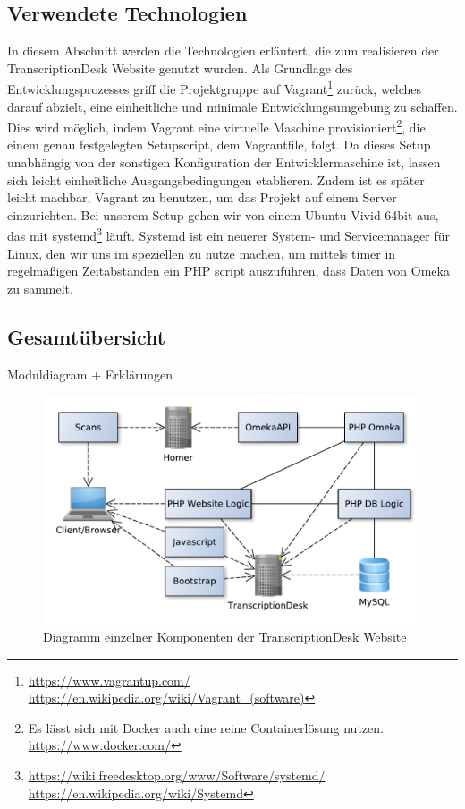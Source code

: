 \documentclass{article}
\begin{document}
\subsection{Verwendete Technologien}
In diesem Abschnitt werden die Technologien erläutert,
die zum realisieren der TranscriptionDesk Website genutzt wurden.
Als Grundlage des Entwicklungsprozesses griff die Projektgruppe auf Vagrant\footnote{
    \url{https://www.vagrantup.com/}\\
    \url{https://en.wikipedia.org/wiki/Vagrant_(software)}}
zurück, welches darauf abzielt, eine einheitliche und minimale Entwicklungsumgebung zu schaffen.
Dies wird möglich, indem Vagrant eine virtuelle Maschine provisioniert\footnote{
    Es lässt sich mit Docker auch eine reine Containerlösung nutzen.\\
    \url{https://www.docker.com/}},
die einem genau festgelegten Setupscript, dem Vagrantfile, folgt.
Da dieses Setup unabhängig von der sonstigen Konfiguration der Entwicklermaschine ist,
lassen sich leicht einheitliche Ausgangsbedingungen etablieren.
Zudem ist es später leicht machbar, Vagrant zu benutzen,
um das Projekt auf einem Server einzurichten.
Bei unserem Setup gehen wir von einem Ubuntu Vivid 64bit aus,
das mit systemd\footnote{
    \url{https://wiki.freedesktop.org/www/Software/systemd/}\\
    \url{https://en.wikipedia.org/wiki/Systemd}}
läuft. Systemd ist ein neuerer System- und Servicemanager für Linux,
den wir uns im speziellen zu nutze machen,
um mittels timer in regelmäßigen Zeitabständen
ein PHP script auszuführen,
dass Daten von Omeka zu sammelt.%

\subsection{Gesamtübersicht}
Moduldiagram + Erklärungen
\\\begin{figure}[H]
\includegraphics[width=\textwidth]{../notes/components.pdf}
\caption{Diagramm einzelner Komponenten der TranscriptionDesk Website}
\label{fig:components}
\end{figure}
\end{document}
